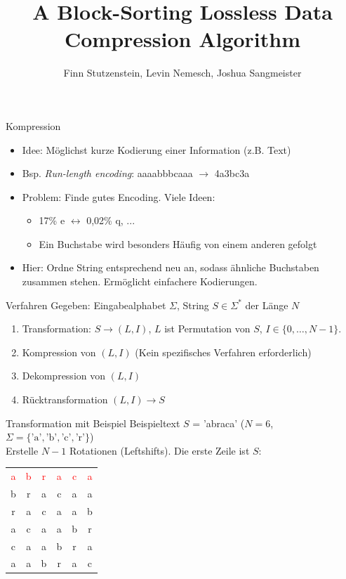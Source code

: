 \documentclass[ngerman,aspectratio=169,10pt]{beamer}
\title{A Block-Sorting Lossless Data Compression Algorithm}
\author{Finn Stutzenstein, Levin Nemesch, Joshua Sangmeister}
\institute{Algorithm Engineering - Übung 5}
\newcommand{\red}[1]{\textcolor{red}{#1}}
\begin{document}
\maketitle

\begin{frame}{Kompression}
\begin{itemize}
    \item Idee: Möglichst kurze Kodierung einer Information (z.B. Text)
    \item Bsp. \emph{Run-length encoding}: aaaabbbcaaa $\longrightarrow$ 4a3bc3a
    \item Problem: Finde gutes Encoding. Viele Ideen:
    \begin{itemize}
        \item 17\% e $\leftrightarrow$ 0,02\% q, ...
        \item Ein Buchstabe wird besonders Häufig von einem anderen gefolgt
    \end{itemize}
    \item Hier: Ordne String entsprechend neu an, sodass ähnliche Buchstaben zusammen stehen. Ermöglicht einfachere Kodierungen.
\end{itemize}
\end{frame}

\begin{frame}{Verfahren}
    Gegeben: Eingabealphabet $\Sigma$, String $S\in \Sigma^*$ der Länge $N$
    \begin{enumerate}
        \item Transformation: $S\rightarrow(L, I)$, $L$ ist Permutation von $S$, $I\in\{0,\ldots,N-1\}$.
        \item Kompression von $(L, I)$ (Kein spezifisches Verfahren erforderlich)
        \item Dekompression von $(L, I)$
        \item Rücktransformation $(L, I)\rightarrow S$
    \end{enumerate}
\end{frame}

\begin{frame}{Transformation mit Beispiel}
    Beispieltext $S$ = 'abraca' ($N = 6$, $\Sigma=\{\text{'a'},\text{'b'},\text{'c'},\text{'r'}\}$)\\[1cm]
    
    Erstelle $N-1$ Rotationen (Leftshifts). Die erste Zeile ist $S$:\\
    \begin{tabular}{cccccc}
        \red{a}&\red{b}&\red{r}&\red{a}&\red{c}&\red{a}\vline\\
        b&r&a&c&a\vline&a\\
        r&a&c&a\vline&a&b\\
        a&c&a\vline&a&b&r\\
        c&a\vline&a&b&r&a\\
        a\vline&a&b&r&a&c\\
    \end{tabular}
\end{frame}
\end{document}
